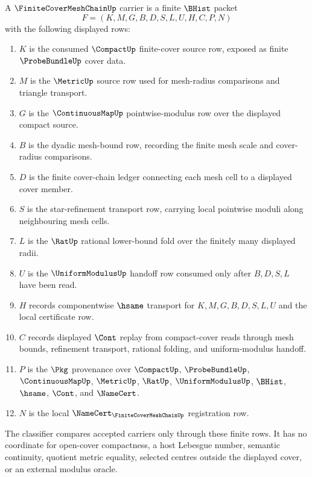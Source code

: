 \begin{definition}
\label{def:finite-cover-mesh-chain-carrier}
A $\FiniteCoverMeshChainUp$ carrier is a finite $\BHist$ packet
$$
F=(K,M,G,B,D,S,L,U,H,C,P,N)
$$
with the following displayed rows:
\begin{enumerate}
\item $K$ is the consumed $\CompactUp$ finite-cover source row, exposed as finite $\ProbeBundleUp$ cover data.
\item $M$ is the $\MetricUp$ source row used for mesh-radius comparisons and triangle transport.
\item $G$ is the $\ContinuousMapUp$ pointwise-modulus row over the displayed compact source.
\item $B$ is the dyadic mesh-bound row, recording the finite mesh scale and cover-radius comparisons.
\item $D$ is the finite cover-chain ledger connecting each mesh cell to a displayed cover member.
\item $S$ is the star-refinement transport row, carrying local pointwise moduli along neighbouring mesh cells.
\item $L$ is the $\RatUp$ rational lower-bound fold over the finitely many displayed radii.
\item $U$ is the $\UniformModulusUp$ handoff row consumed only after $B,D,S,L$ have been read.
\item $H$ records componentwise $\hsame$ transport for $K,M,G,B,D,S,L,U$ and the local certificate row.
\item $C$ records displayed $\Cont$ replay from compact-cover reads through mesh bounds, refinement transport, rational folding, and uniform-modulus handoff.
\item $P$ is the $\Pkg$ provenance over $\CompactUp$, $\ProbeBundleUp$, $\ContinuousMapUp$, $\MetricUp$, $\RatUp$, $\UniformModulusUp$, $\BHist$, $\hsame$, $\Cont$, and $\NameCert$.
\item $N$ is the local $\NameCert_{\FiniteCoverMeshChainUp}$ registration row.
\end{enumerate}
The classifier compares accepted carriers only through these finite rows. It has no coordinate for open-cover compactness, a host Lebesgue number, semantic continuity, quotient metric equality, selected centres outside the displayed cover, or an external modulus oracle.
\end{definition}

